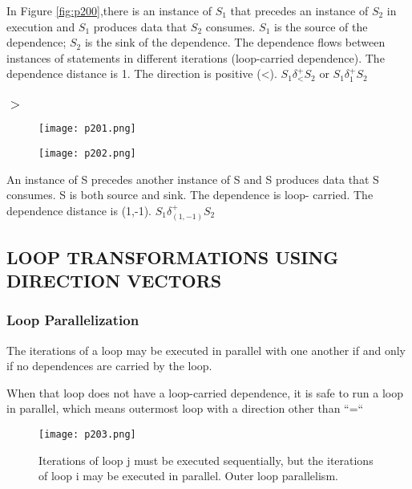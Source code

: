 In Figure \ref{fig:p200},there is an instance of $S_1$ that precedes an instance of $S_2$ in
execution and $S_1$ produces data that $S_2$ consumes.
$S_1$ is the source of the dependence; $S_2$ is the sink of the
dependence.
The dependence flows between instances of statements in
different iterations (loop-carried dependence).
The dependence distance is 1. The direction is positive (<).
$S_1 \delta^{+}_{<} S_2$ or $S_1 \delta^{+}_{1} S_2$


\subsubsection{$>$}

\begin{figure}[H]
	\centering
	\texttt{[image: p201.png]}
	\caption{}
	\label{fig:p201}
\end{figure}

\begin{figure}[H]
	\centering
	\texttt{[image: p202.png]}
	\caption{}
	\label{fig:p202}
\end{figure}


An instance of S precedes
another instance of S and
S produces data that S
consumes. S is both source and sink. The dependence is loop-
carried.
The dependence distance
is (1,-1). $S_1 \delta^{+}_{(1,-1)} S_2$


\subsection{LOOP TRANSFORMATIONS USING DIRECTION VECTORS}

\subsubsection{Loop Parallelization}

The iterations of a loop may be executed
in parallel with one another if and only if
no dependences are carried by the loop.

When that loop does not have a loop-carried dependence, it
is safe to run a loop in parallel, which means
outermost loop with a direction other than “=“

\begin{figure}[H]
	\centering
	\texttt{[image: p203.png]}
	\caption{Iterations of loop j must be executed sequentially, but the
		iterations of loop i may be executed in parallel. Outer loop parallelism.}
	\label{fig:p203}
\end{figure}


